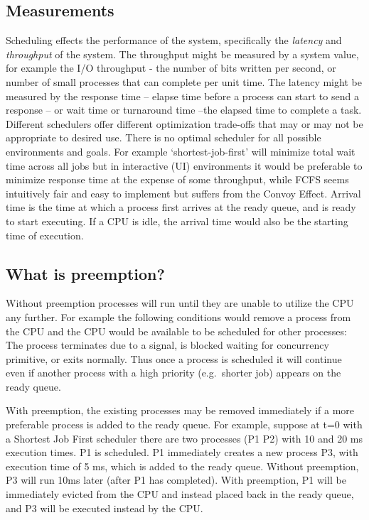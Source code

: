 \subsection{Measurements}

Scheduling effects the performance of the system, specifically the \emph{latency} and \emph{throughput} of the system. The throughput might be measured by a system value, for example the I/O throughput - the number of bits written per second, or number of small processes that can complete per unit time. The latency might be measured by the response time -- elapse time before a process can start to send a response -- or wait time or turnaround time --the elapsed time to complete a task. Different schedulers offer different optimization trade-offs that may or may not be appropriate to desired use. There is no optimal scheduler for all possible environments and goals. For example `shortest-job-first' will minimize total wait time across all jobs but in interactive (UI) environments it would be preferable to minimize response time at the expense of some throughput, while FCFS seems intuitively fair and easy to implement but suffers from the Convoy Effect. Arrival time is the time at which a process first arrives at the ready queue, and is ready to start executing. If a CPU is idle, the arrival time would also be the starting time of execution.

\subsection{What is preemption?}

Without preemption processes will run until they are unable to utilize the CPU any further. For example the following conditions would remove a process from the CPU and the CPU would be available to be scheduled for other processes: The process terminates due to a signal, is blocked waiting for concurrency primitive, or exits normally. Thus once a process is scheduled it will continue even if another process with a high priority (e.g.~shorter job) appears on the ready queue.

With preemption, the existing processes may be removed immediately if a more preferable process is added to the ready queue. For example, suppose at t=0 with a Shortest Job First scheduler there are two processes (P1 P2) with 10 and 20 ms execution times. P1 is scheduled. P1 immediately creates a new process P3, with execution time of 5 ms, which is added to the ready queue. Without preemption, P3 will run 10ms later (after P1 has completed). With preemption, P1 will be immediately evicted from the CPU and instead placed back in the ready queue, and P3 will be executed instead by the CPU.


